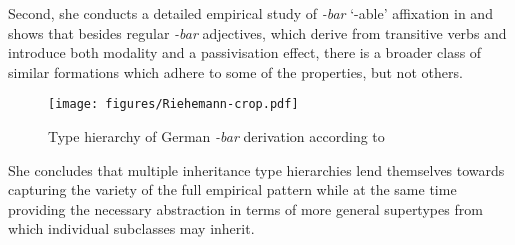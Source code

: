 \documentclass[output=paper
 	        ,biblatex
                ,babelshorthands
                ,newtxmath
                ,draftmode
                ,colorlinks, citecolor=brown
]{langscibook}
\begin{document}
Second, she conducts a detailed empirical study of \textit{-bar}
`-able' affixation in  and shows that besides regular
\textit{-bar} adjectives, which derive from transitive verbs and
introduce both modality and a  passivisation effect, there is a 
broader class of similar formations which adhere to some of the
properties, but not others.

\begin{figure}
  \centering
  \texttt{[image: figures/Riehemann-crop.pdf]}
  
  \caption{Type hierarchy of German
    \textit{-bar} derivation according to \citet[]{Riehemann98} }
  \label{fig:Riehemann}
\end{figure}

She concludes that multiple inheritance type hierarchies lend
themselves towards capturing the variety of the full empirical pattern
while at the same time providing the necessary abstraction in terms of
more general supertypes from which individual subclasses may inherit. 



\end{document}
